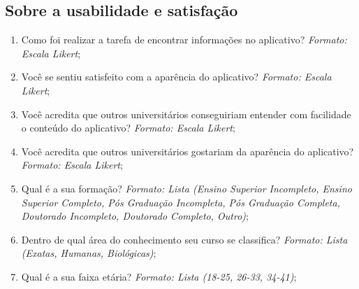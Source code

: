 \documentclass[12pt]{article}
\begin{document}
\subsection{Sobre a usabilidade e satisfação}

\begin{enumerate}
	\item Como foi realizar a tarefa de encontrar informações no aplicativo? \textit{Formato: Escala Likert};
	\item Você se sentiu satisfeito com a aparência do aplicativo? \textit{Formato: Escala Likert};
	\item Você acredita que outros universitários conseguiriam entender com facilidade o conteúdo do aplicativo? \textit{Formato: Escala Likert};
	\item Você acredita que outros universitários gostariam da aparência do aplicativo? \textit{Formato: Escala Likert};
	\item Qual é a sua formação? \textit{Formato: Lista (Ensino Superior Incompleto, Ensino Superior Completo, Pós Graduação Incompleta, Pós Graduação Completa, Doutorado Incompleto, Doutorado Completo, Outro)};
	\item Dentro de qual área do conhecimento seu curso se classifica? \textit{Formato: Lista (Exatas, Humanas, Biológicas)};
	\item Qual é a sua faixa etária? \textit{Formato: Lista (18-25, 26-33, 34-41)};
\end{enumerate}
\end{document}
